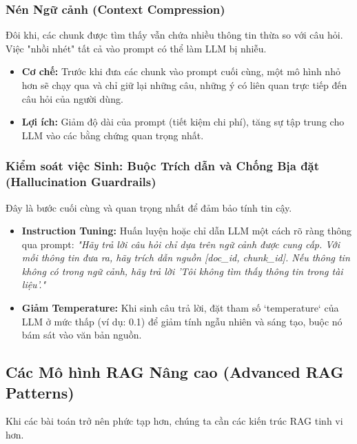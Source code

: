 \subsubsection{Nén Ngữ cảnh (Context Compression)}
Đôi khi, các chunk được tìm thấy vẫn chứa nhiều thông tin thừa so với câu hỏi. Việc "nhồi nhét" tất cả vào prompt có thể làm LLM bị nhiễu.
\begin{itemize}
    \item \textbf{Cơ chế:} Trước khi đưa các chunk vào prompt cuối cùng, một mô hình nhỏ hơn sẽ chạy qua và chỉ giữ lại những câu, những ý có liên quan trực tiếp đến câu hỏi của người dùng.
    \item \textbf{Lợi ích:} Giảm độ dài của prompt (tiết kiệm chi phí), tăng sự tập trung cho LLM vào các bằng chứng quan trọng nhất.
\end{itemize}

\subsubsection{Kiểm soát việc Sinh: Buộc Trích dẫn và Chống Bịa đặt (Hallucination Guardrails)}
Đây là bước cuối cùng và quan trọng nhất để đảm bảo tính tin cậy.
\begin{itemize}
    \item \textbf{Instruction Tuning:} Huấn luyện hoặc chỉ dẫn LLM một cách rõ ràng thông qua prompt: \textit{"Hãy trả lời câu hỏi chỉ dựa trên ngữ cảnh được cung cấp. Với mỗi thông tin đưa ra, hãy trích dẫn nguồn [doc\_id, chunk\_id]. Nếu thông tin không có trong ngữ cảnh, hãy trả lời 'Tôi không tìm thấy thông tin trong tài liệu'."}
    \item \textbf{Giảm Temperature:} Khi sinh câu trả lời, đặt tham số `temperature` của LLM ở mức thấp (ví dụ: 0.1) để giảm tính ngẫu nhiên và sáng tạo, buộc nó bám sát vào văn bản nguồn.
\end{itemize}

\subsection{Các Mô hình RAG Nâng cao (Advanced RAG Patterns)}
\label{ssec:advanced_rag_patterns}
Khi các bài toán trở nên phức tạp hơn, chúng ta cần các kiến trúc RAG tinh vi hơn.

